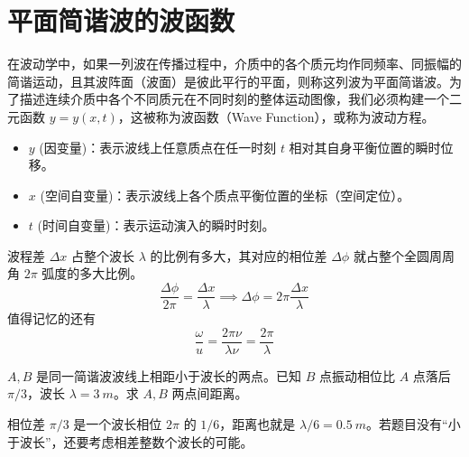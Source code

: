 
\section{平面简谐波的波函数}
在波动学中，如果一列波在传播过程中，介质中的各个质元均作同频率、同振幅的简谐运动，且其波阵面（波面）是彼此平行的平面，则称这列波为平面简谐波。为了描述连续介质中各个不同质元在不同时刻的整体运动图像，我们必须构建一个二元函数 $y = y(x,t)$，这被称为波函数（Wave Function），或称为波动方程。
\begin{itemize}
\item $y$ (因变量)：表示波线上任意质点在任一时刻 $t$ 相对其自身平衡位置的瞬时位移。
\item $x$ (空间自变量)：表示波线上各个质点平衡位置的坐标（空间定位）。
\item $t$ (时间自变量)：表示运动演入的瞬时时刻。
\end{itemize}

\begin{theorem}[相位差与波程差转换公式]
波程差 $\Delta x$ 占整个波长 $\lambda$ 的比例有多大，其对应的相位差 $\Delta \phi$ 就占整个全圆周周角 $2\pi$ 弧度的多大比例。$$\frac{\Delta \phi}{2\pi}=\frac{\Delta x}{\lambda}\implies\boxed{\Delta \phi = 2\pi \frac{\Delta x}{\lambda}}$$值得记忆的还有$$\frac{\omega}{u} = \frac{2\pi \nu}{\lambda \nu} = \frac{2\pi}{\lambda}$$
\end{theorem}

\begin{exercise}
\(A,B\) 是同一简谐波波线上相距小于波长的两点。已知 \(B\) 点振动相位比 \(A\) 点落后 \(\pi/3\)，波长 \(\lambda=\SI{3}{m}\)。求 \(A,B\) 两点间距离。
\end{exercise}

\begin{solution}
相位差 \(\pi/3\) 是一个波长相位 \(2\pi\) 的 \(1/6\)，距离也就是 \(\lambda/6=\SI{0.5}{m}\)。若题目没有“小于波长”，还要考虑相差整数个波长的可能。
\end{solution}

